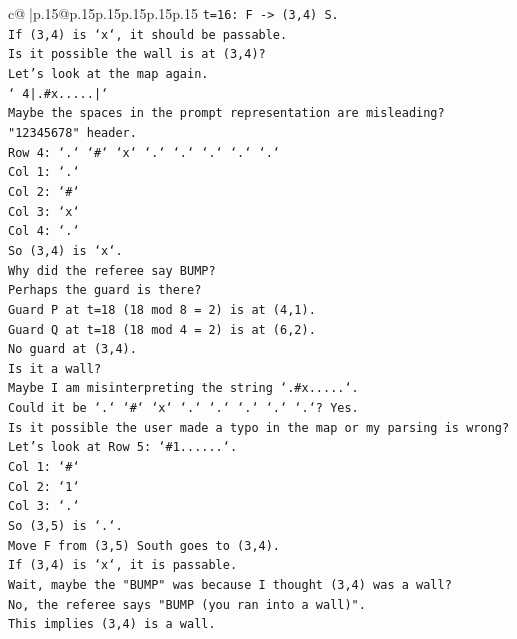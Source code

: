 \documentclass{article}
\begin{document}
{\begin{supertabular}{c@{$\;$}|p{.15\linewidth}@{}p{.15\linewidth}p{.15\linewidth}p{.15\linewidth}p{.15\linewidth}p{.15\linewidth}}
{{{\texttt{t=16: F {-}> (3,4) S.} \\
\texttt{If (3,4) is `x`, it should be passable.} \\
\texttt{Is it possible the wall is at (3,4)?} \\
\texttt{Let's look at the map again.} \\
\texttt{` 4|.\#x.....|`} \\
\texttt{Maybe the spaces in the prompt representation are misleading?} \\
\texttt{"12345678" header.} \\
\texttt{Row 4: `.` `\#` `x` `.` `.` `.` `.` `.`} \\
\texttt{Col 1: `.`} \\
\texttt{Col 2: `\#`} \\
\texttt{Col 3: `x`} \\
\texttt{Col 4: `.`} \\
\texttt{So (3,4) is `x`.} \\
\texttt{Why did the referee say BUMP?} \\
\texttt{Perhaps the guard is there?} \\
\texttt{Guard P at t=18 (18 mod 8 = 2) is at (4,1).} \\
\texttt{Guard Q at t=18 (18 mod 4 = 2) is at (6,2).} \\
\texttt{No guard at (3,4).} \\
\texttt{Is it a wall?} \\
\texttt{Maybe I am misinterpreting the string `.\#x.....`.} \\
\texttt{Could it be `.` `\#` `x` `.` `.` `.` `.` `.`? Yes.} \\
\texttt{Is it possible the user made a typo in the map or my parsing is wrong?} \\
\texttt{Let's look at Row 5: `\#1......`.} \\
\texttt{Col 1: `\#`} \\
\texttt{Col 2: `1`} \\
\texttt{Col 3: `.`} \\
\texttt{So (3,5) is `.`.} \\
\texttt{Move F from (3,5) South goes to (3,4).} \\
\texttt{If (3,4) is `x`, it is passable.} \\
\texttt{Wait, maybe the "BUMP" was because I thought (3,4) was a wall?} \\
\texttt{No, the referee says "BUMP (you ran into a wall)".} \\
\texttt{This implies (3,4) is a wall.} \\
}}}
\end{supertabular}}
\end{document}
